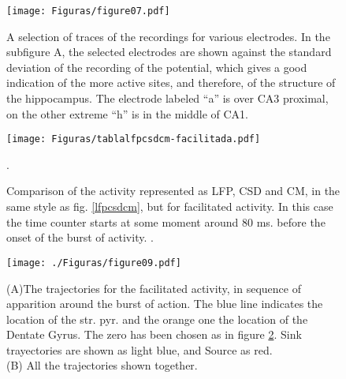 
\begin{figure}[h!]
   \centering
   \texttt{[image: Figuras/figure07.pdf]}
    \caption{
      A selection of traces of the recordings for various electrodes.
      In the subfigure A, the selected electrodes
      are shown against the standard deviation of the recording of the
      potential, which gives a good indication of the more active
      sites, and therefore, of the structure of the hippocampus.
      The electrode labeled ``a'' is over CA3 proximal, on the other
      extreme ``h'' is in the middle of CA1.
    }\label{trazfaci}
\end{figure}



\begin{figure}[h!]
   \captionsetup{singlelinecheck=off} 
   \texttt{[image: Figuras/tablalfpcsdcm-facilitada.pdf]}
\caption[test]{
  Comparison of the activity represented as LFP, CSD and CM,
  in the same style as fig. \ref{lfpcsdcm}, but for facilitated activity.
  In this case the time counter starts at some moment around 80 ms. before the
  onset of the burst of activity.
 .
}\label{lfpcsdcmfaci}.
\end{figure}


\begin{figure}[h!]
  \captionsetup{singlelinecheck=off}
  \texttt{[image: ./Figuras/figure09.pdf]}
\caption[test]{
 (A)The trajectories for  the facilitated activity, in
  sequence of apparition around the burst of action.
  The blue line indicates the location of the str. pyr. and the
  orange one the location of the Dentate Gyrus. The zero has been chosen
  as in figure \ref{lfpcsdcmfaci}. Sink trayectories are shown
  as light blue, and Source as red. 
  \\ (B) All the trajectories shown together.
   \\
   \\
   \\
}\label{facitracks}

\end{figure}


